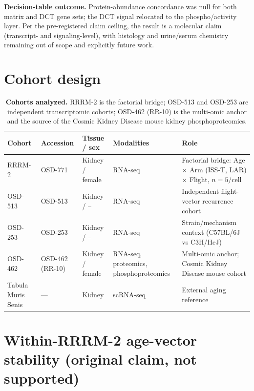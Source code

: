 \documentclass[10pt]{article}
\begin{document}
\noindent
\textbf{Decision-table outcome.} Protein-abundance concordance was null for both matrix and DCT gene sets; the DCT signal relocated to the phospho/activity layer. Per the pre-registered claim ceiling, the result is a molecular claim (transcript- and signaling-level), with histology and urine/serum chemistry remaining out of scope and explicitly future work.

\section{Cohort design}

\begin{table}[H]
\centering\small
\caption{\textbf{Cohorts analyzed.} RRRM-2 is the factorial bridge; OSD-513 and OSD-253 are independent transcriptomic cohorts; OSD-462 (RR-10) is the multi-omic anchor and the source of the Cosmic Kidney Disease mouse kidney phosphoproteomics.}
\label{tab:cohorts}
\begin{tabularx}{\textwidth}{l l l l X}
\toprule
Cohort & Accession & Tissue / sex & Modalities & Role \\
\midrule
RRRM-2 & OSD-771 & Kidney / female & RNA-seq & Factorial bridge: Age $\times$ Arm (ISS-T, LAR) $\times$ Flight, $n=5$/cell \\
OSD-513 & OSD-513 & Kidney / -- & RNA-seq & Independent flight-vector recurrence cohort \\
OSD-253 & OSD-253 & Kidney / -- & RNA-seq & Strain/mechanism context (C57BL/6J vs C3H/HeJ) \\
OSD-462 & OSD-462 (RR-10) & Kidney / female & RNA-seq, proteomics, phosphoproteomics & Multi-omic anchor; Cosmic Kidney Disease mouse cohort \\
Tabula Muris Senis & --- & Kidney & scRNA-seq & External aging reference \\
\bottomrule
\end{tabularx}
\end{table}

\section{Within-RRRM-2 age-vector stability (original claim, not supported)}
\end{document}
